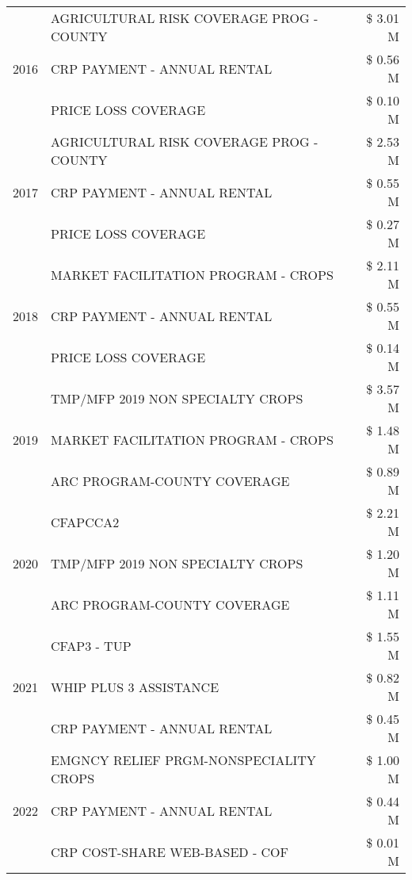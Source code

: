 \begin{tabular}{llr}
\cline{1-3}
\multirow[t]{3}{*}{2016} & AGRICULTURAL RISK COVERAGE PROG - COUNTY & \$ 3.01 M \\
 & CRP PAYMENT - ANNUAL RENTAL & \$ 0.56 M \\
 & PRICE LOSS COVERAGE & \$ 0.10 M \\
\cline{1-3}
\multirow[t]{3}{*}{2017} & AGRICULTURAL RISK COVERAGE PROG - COUNTY & \$ 2.53 M \\
 & CRP PAYMENT - ANNUAL RENTAL & \$ 0.55 M \\
 & PRICE LOSS COVERAGE & \$ 0.27 M \\
\cline{1-3}
\multirow[t]{3}{*}{2018} & MARKET FACILITATION PROGRAM - CROPS & \$ 2.11 M \\
 & CRP PAYMENT - ANNUAL RENTAL & \$ 0.55 M \\
 & PRICE LOSS COVERAGE & \$ 0.14 M \\
\cline{1-3}
\multirow[t]{3}{*}{2019} & TMP/MFP 2019 NON SPECIALTY CROPS & \$ 3.57 M \\
 & MARKET FACILITATION PROGRAM - CROPS & \$ 1.48 M \\
 & ARC PROGRAM-COUNTY COVERAGE & \$ 0.89 M \\
\cline{1-3}
\multirow[t]{3}{*}{2020} & CFAPCCA2 & \$ 2.21 M \\
 & TMP/MFP 2019 NON SPECIALTY CROPS & \$ 1.20 M \\
 & ARC PROGRAM-COUNTY COVERAGE & \$ 1.11 M \\
\cline{1-3}
\multirow[t]{3}{*}{2021} & CFAP3 - TUP & \$ 1.55 M \\
 & WHIP PLUS 3 ASSISTANCE & \$ 0.82 M \\
 & CRP PAYMENT - ANNUAL RENTAL & \$ 0.45 M \\
\cline{1-3}
\multirow[t]{3}{*}{2022} & EMGNCY RELIEF PRGM-NONSPECIALITY CROPS & \$ 1.00 M \\
 & CRP PAYMENT - ANNUAL RENTAL & \$ 0.44 M \\
 & CRP COST-SHARE WEB-BASED - COF & \$ 0.01 M \\
\cline{1-3}
\bottomrule
\end{tabular}
